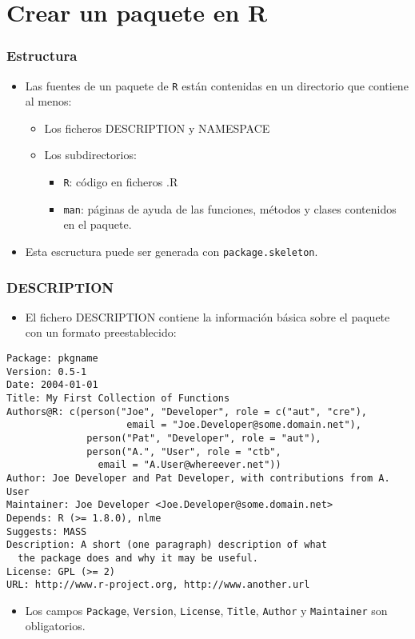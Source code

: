 \documentclass[xcolor={usenames,svgnames,dvipsnames}]{beamer}
\begin{document}
\section{Crear un paquete en R}
\label{sec-2}
\begin{frame}
\frametitle{Estructura}
\label{sec-2-1}

\begin{itemize}
\item Las fuentes de un paquete de \texttt{R} están contenidas en un
  directorio que contiene al menos:
\begin{itemize}
\item Los ficheros DESCRIPTION y NAMESPACE
\item Los subdirectorios:
\begin{itemize}
\item \texttt{R}: código en ficheros .R
\item \texttt{man}: páginas de ayuda de las funciones, métodos y clases
      contenidos en el paquete.
\end{itemize}
\end{itemize}
\item Esta escructura puede ser generada con \texttt{package.skeleton}.
\end{itemize}
\end{frame}
\begin{frame}[fragile]
\frametitle{DESCRIPTION}
\label{sec-2-2}

\begin{itemize}
\item El fichero DESCRIPTION contiene la información básica sobre el
  paquete con un formato preestablecido:
\end{itemize}

\begin{verbatim}
Package: pkgname
Version: 0.5-1
Date: 2004-01-01
Title: My First Collection of Functions
Authors@R: c(person("Joe", "Developer", role = c("aut", "cre"),
                     email = "Joe.Developer@some.domain.net"),
              person("Pat", "Developer", role = "aut"),
              person("A.", "User", role = "ctb",
                email = "A.User@whereever.net"))
Author: Joe Developer and Pat Developer, with contributions from A. User
Maintainer: Joe Developer <Joe.Developer@some.domain.net>
Depends: R (>= 1.8.0), nlme
Suggests: MASS
Description: A short (one paragraph) description of what
  the package does and why it may be useful.
License: GPL (>= 2)
URL: http://www.r-project.org, http://www.another.url
\end{verbatim}
\begin{itemize}
\item Los campos \texttt{Package}, \texttt{Version}, \texttt{License}, \texttt{Title}, \texttt{Author} y
  \texttt{Maintainer} son obligatorios.
\end{itemize}
\end{frame}
\end{document}
